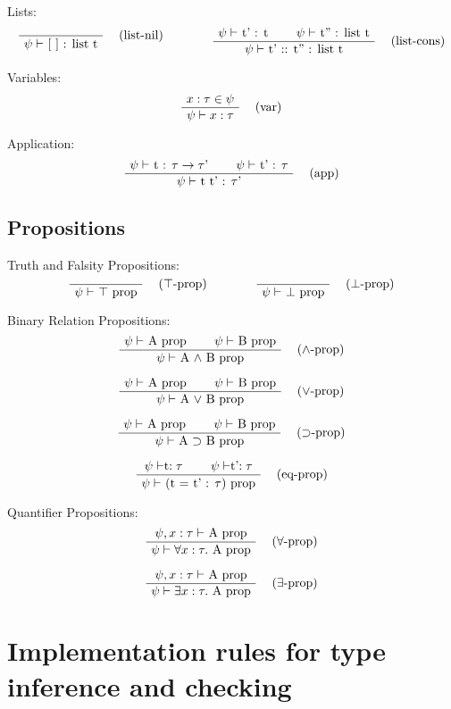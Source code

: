 \documentclass[twoside,a4paper]{article}
\theoremstyle{definition}
\begin{document}
Lists:
\[
\AxiomC{}
\RightLabel{\quad (list-nil)}
\UnaryInfC{$\psi \vdash$ [ ] : list t}
\DisplayProof
\qquad
\qquad
\AxiomC{$\psi \vdash$ t' : t}
\AxiomC{$\psi \vdash$ t'' : list t}
\RightLabel{\quad (list-cons)}
\BinaryInfC{$\psi \vdash$ t' :: t'' : list t}
\DisplayProof
\]

Variables:
\[
\AxiomC{$x : \tau \in \psi$}
\RightLabel{\quad (var)}
\UnaryInfC{$\psi \vdash x : \tau$}
\DisplayProof
\]

Application:
\[
\AxiomC{$\psi \vdash$ t : $\tau \rightarrow \tau$'}
\AxiomC{$\psi \vdash$ t' : $\tau$}
\RightLabel{\quad (app)}
\BinaryInfC{$\psi \vdash$ t t' : $\tau$'}
\DisplayProof
\]

\subsection{Propositions}
Truth and Falsity Propositions:
\[
\AxiomC{}
\RightLabel{\quad ($\top$-prop)}
\UnaryInfC{$\psi \vdash$ $\top$  prop}
\DisplayProof
\qquad
\qquad
\AxiomC{}
\RightLabel{\quad ($\bot$-prop)}
\UnaryInfC{$\psi \vdash$ $\bot$  prop}
\DisplayProof
\]

Binary Relation Propositions:
\[
\AxiomC{$\psi \vdash$ A prop}
\AxiomC{$\psi \vdash$ B prop}
\RightLabel{\quad ($\wedge$-prop)}
\BinaryInfC{$\psi \vdash$ A $\wedge$ B prop}
\DisplayProof
\]

\[
\AxiomC{$\psi \vdash$ A prop}
\AxiomC{$\psi \vdash$ B prop}
\RightLabel{\quad ($\vee$-prop)}
\BinaryInfC{$\psi \vdash$ A $\vee$ B prop}
\DisplayProof
\]

\[
\AxiomC{$\psi \vdash$ A prop}
\AxiomC{$\psi \vdash$ B prop}
\RightLabel{\quad ($\supset$-prop)}
\BinaryInfC{$\psi \vdash$ A $\supset$ B prop}
\DisplayProof
\]

\[
\AxiomC{$\psi \vdash $t$ : \tau$}
\AxiomC{$\psi \vdash $t'$ : \tau$}
\RightLabel{\quad (eq-prop)}
\BinaryInfC{$\psi \vdash$ (t = t' : $\tau$) prop}
\DisplayProof
\]

Quantifier Propositions:
\[
\AxiomC{$\psi , x : \tau \vdash$ A prop}
\RightLabel{\quad ($\forall$-prop)}
\UnaryInfC{$\psi \vdash \forall x : \tau .$ A prop}
\DisplayProof
\]

\[
\AxiomC{$\psi , x : \tau \vdash$ A prop}
\RightLabel{\quad ($\exists$-prop)}
\UnaryInfC{$\psi \vdash \exists x : \tau .$ A prop}
\DisplayProof
\]

\section{Implementation rules for type inference and checking}
\end{document}
